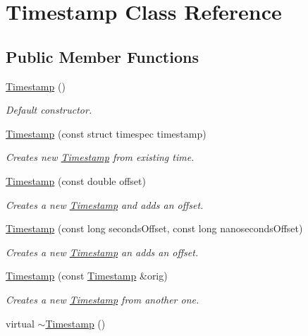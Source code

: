 \hypertarget{class_timestamp}{}\section{Timestamp Class Reference}
\label{class_timestamp}
\subsection*{Public Member Functions}
\begin{DoxyCompactItemize}
\item 
\hyperlink{class_timestamp_a2e610487ef16d9d5a8d6dc8ad457a3e7}{Timestamp} ()
\begin{DoxyCompactList}\small\item\em Default constructor. \end{DoxyCompactList}\item 
\hyperlink{class_timestamp_ac7b873fcf504e5b1a4992700b3f15859}{Timestamp} (const struct timespec timestamp)
\begin{DoxyCompactList}\small\item\em Creates new \hyperlink{class_timestamp}{Timestamp} from existing time. \end{DoxyCompactList}\item 
\hyperlink{class_timestamp_a8afe99da43f900554ceabe9b120139dd}{Timestamp} (const double offset)
\begin{DoxyCompactList}\small\item\em Creates a new \hyperlink{class_timestamp}{Timestamp} and adds an offset. \end{DoxyCompactList}\item 
\hyperlink{class_timestamp_a0d786922f934586038c340ba1504ad0f}{Timestamp} (const long seconds\+Offset, const long nanoseconds\+Offset)
\begin{DoxyCompactList}\small\item\em Creates a new \hyperlink{class_timestamp}{Timestamp} an adds an offset. \end{DoxyCompactList}\item 
\hyperlink{class_timestamp_a3816f44498d5e62bb3adeb502c7f08fa}{Timestamp} (const \hyperlink{class_timestamp}{Timestamp} \&orig)
\begin{DoxyCompactList}\small\item\em Creates a new \hyperlink{class_timestamp}{Timestamp} from another one. \end{DoxyCompactList}\item 
\hypertarget{class_timestamp_ae1fc6b2bb504bc0d1536603228f1d493}{}virtual \hyperlink{class_timestamp_ae1fc6b2bb504bc0d1536603228f1d493}{$\sim$\+Timestamp} ()\label{class_timestamp_ae1fc6b2bb504bc0d1536603228f1d493}


\end{DoxyCompactItemize}
